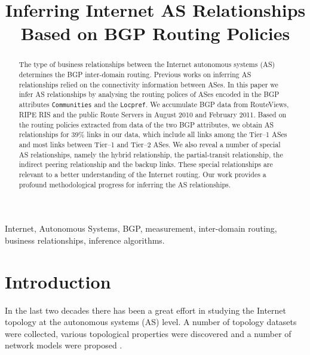 \documentclass[conference]{IEEEtran}
\begin{document}
\lstset{basicstyle=\footnotesize}

\title{Inferring Internet AS Relationships\\  Based on BGP Routing Policies}


\author{
\and
{}
}

\maketitle


\begin{abstract}
The type of business relationships between the Internet autonomous systems (AS) determines the BGP inter-domain routing.
Previous works on inferring  AS relationships relied on the  connectivity information between ASes.  
In this paper we infer  AS relationships by analysing the routing polices of ASes encoded in the BGP attributes {\tt  Communities} and the {\tt Locpref}. 
We accumulate  BGP  data from RouteViews, RIPE RIS and the public Route Servers in August 2010 and February 2011.
Based on the routing policies extracted from data of the two BGP attributes, we obtain  AS  relationships for 39\% links in our data, which include all links among the Tier--1 ASes and most links between Tier--1 and Tier--2 ASes. 
We also reveal a number of special AS relationships,  namely the hybrid relationship, the partial-transit relationship, the indirect peering relationship and the backup links. These special relationships are relevant to a better understanding of the Internet routing.
Our work provides a profound methodological progress for inferring the AS relationships. 

\end{abstract}

\begin{IEEEkeywords}
Internet, Autonomous Systems, BGP, measurement, inter-domain routing, business relationships,
inference algorithms.
\end{IEEEkeywords}


\IEEEpeerreviewmaketitle

\section{Introduction}
In the last two decades there has been a great effort in studying the Internet topology at the autonomous systems (AS) level. A number of topology datasets were collected, various topological properties were discovered and a number of network models were proposed \cite{Oliveira:2007, Roughan:2008, Dhamdhere:2011, Donnet:2007, Zhou:2004}. 
\end{document}

